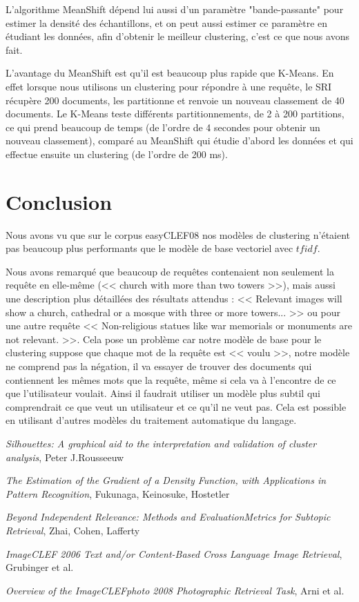 \documentclass{article}
\begin{document}
L'algorithme MeanShift dépend lui aussi d'un paramètre "bande-passante" pour estimer la densité des échantillons, et on peut aussi estimer ce paramètre en étudiant les données, afin d'obtenir le meilleur clustering, c'est ce que nous avons fait.

L'avantage du MeanShift est qu'il est beaucoup plus rapide que K-Means. En effet lorsque nous utilisons un clustering pour répondre à une requête, le SRI récupère 200 documents, les partitionne et renvoie un nouveau classement de 40 documents.
Le K-Means teste différents partitionnements, de 2 à 200 partitions, ce qui prend beaucoup de temps (de l'ordre de 4 secondes pour obtenir un nouveau classement), comparé au MeanShift qui étudie d'abord les données et qui effectue ensuite un clustering (de l'ordre de 200 ms).

\section{Conclusion}

Nous avons vu que sur le corpus easyCLEF08 nos modèles de clustering n'étaient pas beaucoup plus performants que le modèle de base vectoriel avec $tfidf$.

Nous avons remarqué que beaucoup de requêtes contenaient non seulement la requête en elle-même (<< church with more than two towers >>), mais aussi une description plus détaillées des résultats attendus : << Relevant images will show a church, cathedral or a mosque with three or more towers... >> ou pour une autre requête << Non-religious statues like war memorials or monuments are not relevant. >>. Cela pose un problème car notre modèle de base pour le clustering suppose que chaque mot de la requête est << voulu >>, notre modèle ne comprend pas la négation, il va essayer de trouver des documents qui contiennent les mêmes mots que la requête, même si cela va à l'encontre de ce que l'utilisateur voulait. 
Ainsi il faudrait utiliser un modèle plus subtil qui comprendrait ce que veut un utilisateur et ce qu'il ne veut pas. Cela est possible en utilisant d'autres modèles du traitement automatique du langage.

\begin{thebibliography}{9}
\textit{Silhouettes: A graphical aid to the interpretation and validation of cluster analysis},
Peter J.Rousseeuw

\textit{The Estimation of the Gradient of a Density Function, with Applications in Pattern Recognition}, Fukunaga, Keinosuke, Hostetler

\textit{Beyond Independent Relevance: Methods and EvaluationMetrics for Subtopic Retrieval}, Zhai, Cohen, Lafferty

\textit{ImageCLEF 2006
Text and/or Content-Based Cross Language Image Retrieval}, Grubinger et al.

\textit{Overview of the ImageCLEFphoto 2008  
Photographic Retrieval Task}, Arni et al.
\end{thebibliography}
\end{document}
